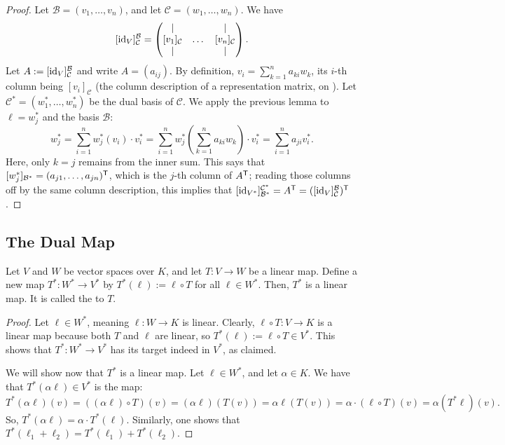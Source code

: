 \begin{proof}
  Let $\mathcal{B} = (v_1, \dots, v_n)$, and let $\mathcal{C} = (w_1, \dots, w_n)$. We have 
  \[[\operatorname{id}_V]_{\mathcal{C}}^{\mathcal{B}} = \begin{pmatrix} | & & | \\ [v_1]_{\mathcal{C}} & \dots & [v_n]_{\mathcal{C}} \\ | & & | \end{pmatrix}.\]
  Let $A := [\operatorname{id}_V]_{\mathcal{C}}^{\mathcal{B}}$ and write $A = (a_{ij})$. By definition, $v_i = \sum_{k=1}^n a_{ki} w_k$, its $i$-th column being $[v_i]_{\mathcal{C}}$ (the column description of a representation matrix, on ).
  Let $\mathcal{C}^* = (w_1^*, \dots, w_n^*)$ be the dual basis of $\mathcal{C}$. We apply the previous lemma to $\ell = w_j^*$ and the basis $\mathcal{B}$:
  \[ w_j^* = \sum_{i=1}^n w_j^*(v_i) \cdot v_i^* = \sum_{i=1}^n w_j^*\left(\sum_{k=1}^n a_{ki} w_k\right) \cdot v_i^* = \sum_{i=1}^n a_{ji} v_i^*. \]
  Here, only $k = j$ remains from the inner sum. This says that $[w_j^*]_{\mathcal{B}^*} = (a_{j1}, \dots, a_{jn})^{\mathsf{T}}$, which is the $j$-th column of $A^{\mathsf{T}}$; reading those columns off by the same column description, this implies that $[\operatorname{id}_{V^*}]_{\mathcal{B}^*}^{\mathcal{C}^*} = A^{\mathsf{T}} = ([\operatorname{id}_V]_{\mathcal{C}}^{\mathcal{B}})^{\mathsf{T}}$.
\end{proof}

\subsection{The Dual Map}
\begin{lemma}
  \label{lem:dual_map}
  Let $V$ and $W$ be vector spaces over $K$, and let $T \colon V \to W$ be a linear map. Define a new map $T^* \colon W^* \to V^*$ by $T^*(\ell) := \ell \circ T$ for all $\ell \in W^*$. Then, $T^*$ is a linear map. It is called the  to $T$.
\end{lemma}

\begin{proof}
  Let $\ell \in W^*$, meaning $\ell \colon W \to K$ is linear. Clearly, $\ell \circ T \colon V \to K$ is a linear map because both $T$ and $\ell$ are linear, so $T^*(\ell) := \ell \circ T \in V^*$. This shows that $T^* \colon W^* \to V^*$ has its target indeed in $V^*$, as claimed.

  We will show now that $T^*$ is a linear map. Let $\ell \in W^*$, and let $\alpha \in K$. We have that $T^*(\alpha \ell) \in V^*$ is the map:
  $$T^*(\alpha \ell)(v) = ((\alpha \ell) \circ T)(v) = (\alpha \ell)(T(v)) = \alpha \ell(T(v)) = \alpha \cdot (\ell \circ T)(v) = \alpha (T^* \ell)(v).$$
  So, $T^*(\alpha \ell) = \alpha \cdot T^*(\ell)$. Similarly, one shows that $T^*(\ell_1 + \ell_2) = T^*(\ell_1) + T^*(\ell_2)$.
\end{proof}

